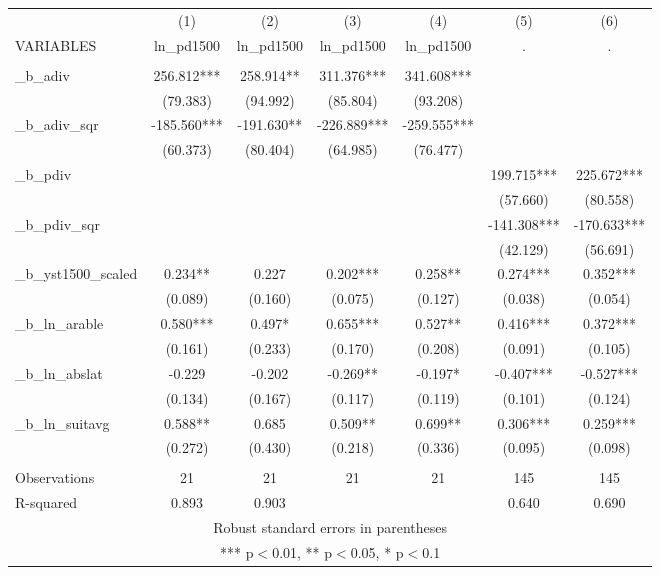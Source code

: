 \documentclass[]{article}
\begin{document}
\begin{tabular}{lcccccc} \hline
 & (1) & (2) & (3) & (4) & (5) & (6) \\
VARIABLES & ln\_pd1500 & ln\_pd1500 & ln\_pd1500 & ln\_pd1500 & . & . \\ \hline
 &  &  &  &  &  &  \\
\_b\_adiv & 256.812*** & 258.914** & 311.376*** & 341.608*** &  &  \\
 & (79.383) & (94.992) & (85.804) & (93.208) &  &  \\
\_b\_adiv\_sqr & -185.560*** & -191.630** & -226.889*** & -259.555*** &  &  \\
 & (60.373) & (80.404) & (64.985) & (76.477) &  &  \\
\_b\_pdiv &  &  &  &  & 199.715*** & 225.672*** \\
 &  &  &  &  & (57.660) & (80.558) \\
\_b\_pdiv\_sqr &  &  &  &  & -141.308*** & -170.633*** \\
 &  &  &  &  & (42.129) & (56.691) \\
\_b\_yst1500\_scaled & 0.234** & 0.227 & 0.202*** & 0.258** & 0.274*** & 0.352*** \\
 & (0.089) & (0.160) & (0.075) & (0.127) & (0.038) & (0.054) \\
\_b\_ln\_arable & 0.580*** & 0.497* & 0.655*** & 0.527** & 0.416*** & 0.372*** \\
 & (0.161) & (0.233) & (0.170) & (0.208) & (0.091) & (0.105) \\
\_b\_ln\_abslat & -0.229 & -0.202 & -0.269** & -0.197* & -0.407*** & -0.527*** \\
 & (0.134) & (0.167) & (0.117) & (0.119) & (0.101) & (0.124) \\
\_b\_ln\_suitavg & 0.588** & 0.685 & 0.509** & 0.699** & 0.306*** & 0.259*** \\
 & (0.272) & (0.430) & (0.218) & (0.336) & (0.095) & (0.098) \\
 &  &  &  &  &  &  \\
Observations & 21 & 21 & 21 & 21 & 145 & 145 \\
 R-squared & 0.893 & 0.903 &  &  & 0.640 & 0.690 \\ \hline
\multicolumn{7}{c}{ Robust standard errors in parentheses} \\
\multicolumn{7}{c}{ *** p$<$0.01, ** p$<$0.05, * p$<$0.1} \\
\end{tabular}
\end{document}
